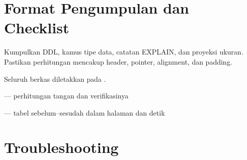 \section{Format Pengumpulan dan Checklist}

Kumpulkan DDL, kamus tipe data, catatan EXPLAIN, dan proyeksi ukuran. Pastikan
perhitungan mencakup header, pointer, alignment, dan padding.

Seluruh berkas diletakkan pada .

\begin{ceklis}
  \item {}
  \item {}
  \item {} --- perhitungan tangan dan verifikasinya
  \item {} --- tabel sebelum--sesudah dalam halaman
        dan detik
  \item {}
  \item {}
  \item {}
\end{ceklis}

\section{Troubleshooting}

